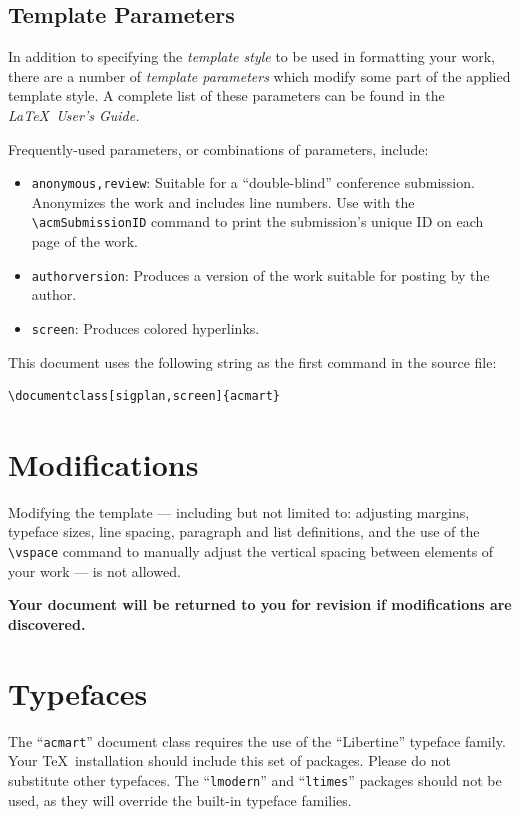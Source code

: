 \documentclass[sigplan,screen]{acmart}
\begin{document}
\subsection{Template Parameters}

In addition to specifying the {\itshape template style} to be used in
formatting your work, there are a number of {\itshape template parameters}
which modify some part of the applied template style. A complete list
of these parameters can be found in the {\itshape \LaTeX\ User's Guide.}

Frequently-used parameters, or combinations of parameters, include:
\begin{itemize}
\item {\verb|anonymous,review|}: Suitable for a ``double-blind''
  conference submission. Anonymizes the work and includes line
  numbers. Use with the \verb|\acmSubmissionID| command to print the
  submission's unique ID on each page of the work.
\item{\verb|authorversion|}: Produces a version of the work suitable
  for posting by the author.
\item{\verb|screen|}: Produces colored hyperlinks.
\end{itemize}

This document uses the following string as the first command in the
source file:
\begin{verbatim}
\documentclass[sigplan,screen]{acmart}
\end{verbatim}

\section{Modifications}

Modifying the template --- including but not limited to: adjusting
margins, typeface sizes, line spacing, paragraph and list definitions,
and the use of the \verb|\vspace| command to manually adjust the
vertical spacing between elements of your work --- is not allowed.

{\bfseries Your document will be returned to you for revision if
  modifications are discovered.}

\section{Typefaces}

The ``\verb|acmart|'' document class requires the use of the
``Libertine'' typeface family. Your \TeX\ installation should include
this set of packages. Please do not substitute other typefaces. The
``\verb|lmodern|'' and ``\verb|ltimes|'' packages should not be used,
as they will override the built-in typeface families.
\end{document}
